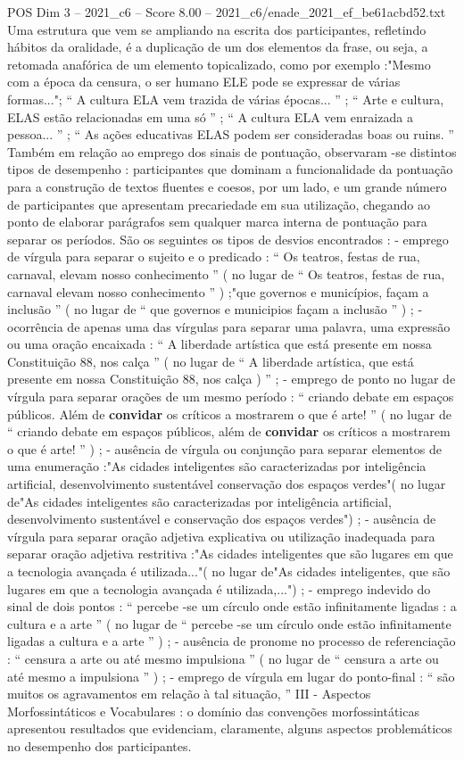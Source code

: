 \begin{textsample}{POS Dim 3 – 2021\_c6 – Score 8.00 – 2021\_c6/enade\_2021\_ef\_be61acbd52.txt}
Uma estrutura que vem se ampliando na escrita dos participantes, refletindo hábitos da oralidade, é a duplicação de um dos elementos da frase, ou seja, a retomada anafórica de um elemento topicalizado, como por exemplo :"Mesmo com a época da censura, o ser humano ELE pode se expressar de várias formas..."; “ A cultura ELA vem trazida de várias épocas... ” ; “ Arte e cultura, ELAS estão relacionadas em uma só ” ; “ A cultura ELA vem enraizada a pessoa... ” ; “ As ações educativas ELAS podem ser consideradas boas ou ruins. ” Também em relação ao emprego dos sinais de pontuação, observaram -se distintos tipos de desempenho : participantes que dominam a funcionalidade da pontuação para a construção de textos fluentes e coesos, por um lado, e um grande número de participantes que apresentam precariedade em sua utilização, chegando ao ponto de elaborar parágrafos sem qualquer marca interna de pontuação para separar os períodos.
São os seguintes os tipos de desvios encontrados : - emprego de vírgula para separar o sujeito e o predicado : “ Os teatros, festas de rua, carnaval, elevam nosso conhecimento ” ( no lugar de “ Os teatros, festas de rua, carnaval elevam nosso conhecimento ” ) ;"que governos e municípios, façam a inclusão ” ( no lugar de “ que governos e municipios façam a inclusão ” ) ; - ocorrência de apenas uma das vírgulas para separar uma palavra, uma expressão ou uma oração encaixada : “ A liberdade artística que está presente em nossa Constituição 88, nos calça ” ( no lugar de “ A liberdade artística, que está presente em nossa Constituição 88, nos calça ) ” ; - emprego de ponto no lugar de vírgula para separar orações de um mesmo período : “ criando debate em espaços públicos.
Além de \textbf{convidar} os críticos a mostrarem o que é arte! ” ( no lugar de “ criando debate em espaços públicos, além de \textbf{convidar} os críticos a mostrarem o que é arte! ” ) ; - ausência de vírgula ou conjunção para separar elementos de uma enumeração :"As cidades inteligentes são caracterizadas por inteligência artificial, desenvolvimento sustentável conservação dos espaços verdes"( no lugar de"As cidades inteligentes são caracterizadas por inteligência artificial, desenvolvimento sustentável e conservação dos espaços verdes") ; - ausência de vírgula para separar oração adjetiva explicativa ou utilização inadequada para separar oração adjetiva restritiva :"As cidades inteligentes que são lugares em que a tecnologia avançada é utilizada..."( no lugar de"As cidades inteligentes, que são lugares em que a tecnologia avançada é utilizada,...") ; - emprego indevido do sinal de dois pontos : “ percebe -se um círculo onde estão infinitamente ligadas : a cultura e a arte ” ( no lugar de “ percebe -se um círculo onde estão infinitamente ligadas a cultura e a arte ” ) ; - ausência de pronome no processo de referenciação : “ censura a arte ou até mesmo impulsiona ” ( no lugar de “ censura a arte ou até mesmo a impulsiona ” ) ; - emprego de vírgula em lugar do ponto-final : “ são muitos os agravamentos em relação à tal situação, ” III - Aspectos Morfossintáticos e Vocabulares : o domínio das convenções morfossintáticas apresentou resultados que evidenciam, claramente, alguns aspectos problemáticos no desempenho dos participantes.

\end{textsample}
